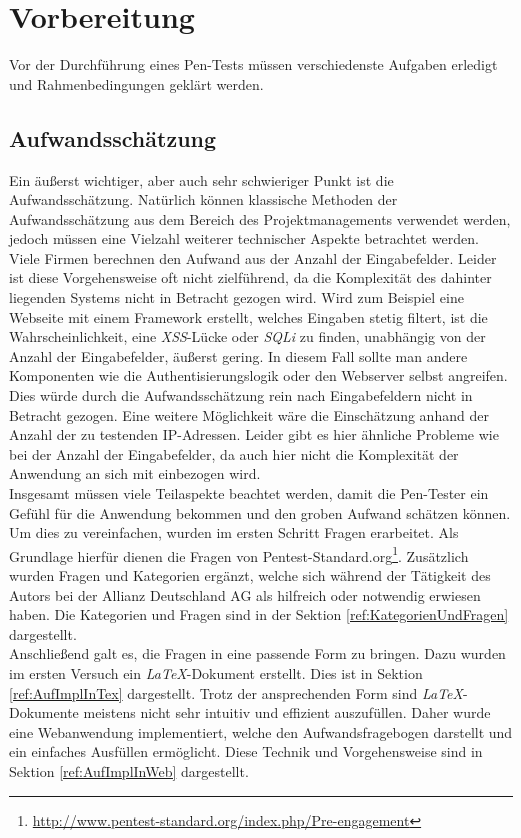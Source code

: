 \section{Vorbereitung}
Vor der Durchführung eines Pen-Tests müssen verschiedenste Aufgaben erledigt und Rahmenbedingungen geklärt werden.

\subsection{Aufwandsschätzung}
	Ein äußerst wichtiger, aber auch sehr schwieriger Punkt ist die Aufwandsschätzung. Natürlich können klassische Methoden der Aufwandsschätzung aus dem Bereich des Projektmanagements verwendet werden, jedoch müssen eine Vielzahl weiterer technischer Aspekte betrachtet werden.\\
	
	Viele Firmen berechnen den Aufwand aus der Anzahl der Eingabefelder. Leider ist diese Vorgehensweise oft nicht zielführend, da die Komplexität des dahinter liegenden Systems nicht in Betracht gezogen wird. Wird zum Beispiel eine Webseite mit einem Framework erstellt, welches Eingaben stetig filtert, ist die Wahrscheinlichkeit, eine \textit{XSS}-Lücke oder \textit{SQLi} zu finden, unabhängig von der Anzahl der Eingabefelder, äußerst gering. In diesem Fall sollte man andere Komponenten wie die Authentisierungslogik oder den Webserver selbst angreifen. Dies würde durch die Aufwandsschätzung rein nach Eingabefeldern nicht in Betracht gezogen. Eine weitere Möglichkeit wäre die Einschätzung anhand der Anzahl der zu testenden IP-Adressen. Leider gibt es hier ähnliche Probleme wie bei der Anzahl der Eingabefelder, da auch hier nicht die Komplexität der Anwendung an sich mit einbezogen wird.\\

Insgesamt müssen viele Teilaspekte beachtet werden, damit die Pen-Tester ein Gefühl für die Anwendung bekommen und den groben Aufwand schätzen können. Um dies zu vereinfachen, wurden im ersten Schritt Fragen erarbeitet. Als Grundlage hierfür dienen die Fragen von Pentest-Standard.org\footnote{\url{http://www.pentest-standard.org/index.php/Pre-engagement}}. Zusätzlich wurden Fragen und Kategorien ergänzt, welche sich während der Tätigkeit des Autors bei der Allianz Deutschland AG als hilfreich oder notwendig erwiesen haben. Die Kategorien und Fragen sind in der Sektion \ref{ref:KategorienUndFragen} dargestellt.\\

Anschließend galt es, die Fragen in eine passende Form zu bringen. Dazu wurden im ersten Versuch ein \textit{LaTeX}-Dokument erstellt. Dies ist in Sektion \ref{ref:AufImplInTex} dargestellt. Trotz der ansprechenden Form sind \textit{LaTeX}-Dokumente meistens nicht sehr intuitiv und effizient auszufüllen. Daher wurde eine Webanwendung implementiert, welche den Aufwandsfragebogen darstellt und ein einfaches Ausfüllen ermöglicht. Diese Technik und Vorgehensweise sind in Sektion \ref{ref:AufImplInWeb} dargestellt.\\ 

